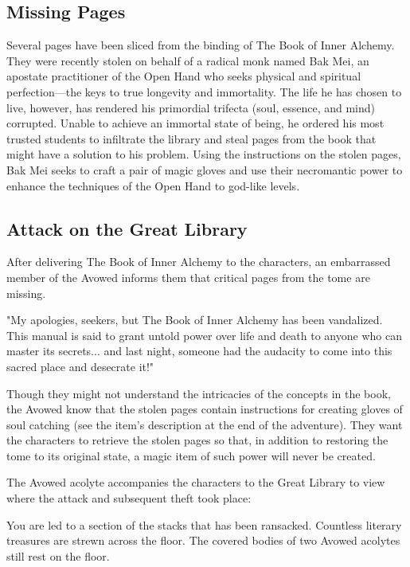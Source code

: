 \documentclass[10pt,a4paper,twoside,bg=print,twocolumn,openany,nodeprecatedcode]{dndbook}
\begin{document}
\subsection{Missing Pages}
Several pages have been sliced from the binding of The Book of Inner Alchemy. They were recently stolen on behalf of a radical monk named Bak Mei, an apostate practitioner of the Open Hand who seeks physical and spiritual perfection—the keys to true longevity and immortality. The life he has chosen to live, however, has rendered his primordial trifecta (soul, essence, and mind) corrupted. Unable to achieve an immortal state of being, he ordered his most trusted students to infiltrate the library and steal pages from the book that might have a solution to his problem. Using the instructions on the stolen pages, Bak Mei seeks to craft a pair of magic gloves and use their necromantic power to enhance the techniques of the Open Hand to god-like levels.

\subsection{Attack on the Great Library}
After delivering The Book of Inner Alchemy to the characters, an embarrassed member of the Avowed informs them that critical pages from the tome are missing.

\begin{DndReadAloud}{}
"My apologies, seekers, but The Book of Inner Alchemy has been vandalized. This manual is said to grant untold power over life and death to anyone who can master its secrets... and last night, someone had the audacity to come into this sacred place and desecrate it!"

\end{DndReadAloud}

Though they might not understand the intricacies of the concepts in the book, the Avowed know that the stolen pages contain instructions for creating gloves of soul catching (see the item's description at the end of the adventure). They want the characters to retrieve the stolen pages so that, in addition to restoring the tome to its original state, a magic item of such power will never be created.

The Avowed acolyte accompanies the characters to the Great Library to view where the attack and subsequent theft took place:

\begin{DndReadAloud}{}
You are led to a section of the stacks that has been ransacked. Countless literary treasures are strewn across the floor. The covered bodies of two Avowed acolytes still rest on the floor.

\end{DndReadAloud}
\end{document}

